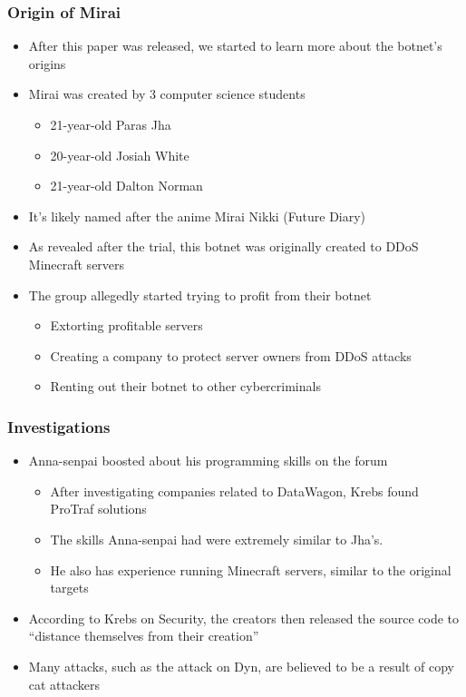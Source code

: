 \documentclass{beamer}
\begin{document}
\begin{frame}
	\frametitle{Origin of Mirai}
	\begin{itemize}
		\item After this paper was released, we started to learn more about the botnet's origins
		\item Mirai was created by 3 computer science students
		\begin{itemize}
			\item 21-year-old Paras Jha
			\item 20-year-old Josiah White
			\item 21-year-old Dalton Norman
		\end{itemize}
		\item It's likely named after the anime Mirai Nikki (Future Diary)
		\item As revealed after the trial, this botnet was originally created to DDoS Minecraft servers
		\item The group allegedly started trying to profit from their botnet
		\begin{itemize}
			\item Extorting profitable servers
			\item Creating a company to protect server owners from DDoS attacks
			\item Renting out their botnet to other cybercriminals
		\end{itemize}
	\end{itemize}
\end{frame}

\begin{frame}
	\frametitle{Investigations}
	\begin{itemize}
		\item Anna-senpai boosted about his programming skills on the forum
		\begin{itemize}
			\item After investigating companies related to DataWagon, Krebs found ProTraf solutions
			\item The skills Anna-senpai had were extremely similar to Jha's.
			\item He also has experience running Minecraft servers, similar to the original targets
		\end{itemize}
		\item According to Krebs on Security, the creators then released the source code to ``distance themselves from their creation''
		\item Many attacks, such as the attack on Dyn, are believed to be a result of copy cat attackers
	\end{itemize}
\end{frame}
\end{document}
